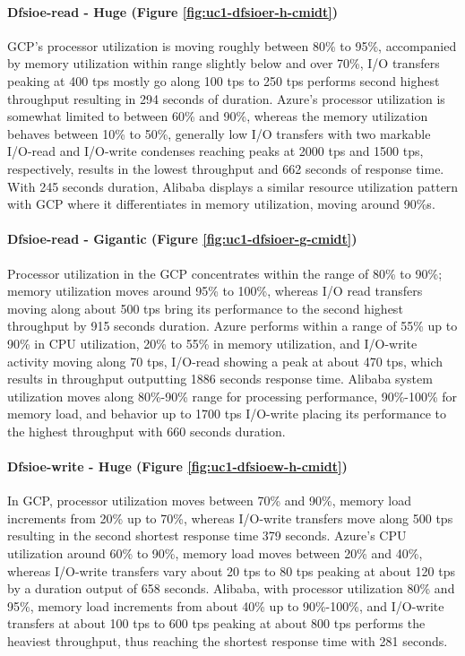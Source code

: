 \documentclass[review]{elsarticle}
\begin{document}
\paragraph{Dfsioe-read - Huge (Figure \ref{fig:uc1-dfsioer-h-cmidt})}GCP's processor utilization is moving roughly between 80\% to 95\%, accompanied by memory utilization within range slightly below and over 70\%, I/O transfers peaking at 400 tps mostly go along 100 tps to 250 tps performs second highest throughput resulting in 294 seconds of duration. Azure's processor utilization is somewhat limited to between 60\% and 90\%, whereas the memory utilization behaves between 10\% to 50\%, generally low I/O transfers with two markable I/O-read and I/O-write condenses reaching peaks at 2000 tps and 1500 tps, respectively, results in the lowest throughput and 662 seconds of response time. With 245 seconds duration, Alibaba displays a similar resource utilization pattern with GCP where it differentiates in memory utilization, moving around 90\%s.

\paragraph{Dfsioe-read - Gigantic (Figure \ref{fig:uc1-dfsioer-g-cmidt})}Processor utilization in the GCP concentrates within the range of 80\% to 90\%; memory utilization moves around 95\% to 100\%, whereas I/O read transfers moving along about 500 tps bring its performance to the second highest throughput by 915 seconds duration. Azure performs within a range of 55\% up to 90\% in CPU utilization, 20\% to 55\% in memory utilization, and I/O-write activity moving along 70 tps, I/O-read showing a peak at about 470 tps, which results in throughput outputting 1886 seconds response time. Alibaba system utilization moves along 80\%-90\% range for processing performance, 90\%-100\% for memory load, and behavior up to 1700 tps I/O-write placing its performance to the highest throughput with 660 seconds duration.

\paragraph{Dfsioe-write - Huge (Figure \ref{fig:uc1-dfsioew-h-cmidt})}In GCP, processor utilization moves between 70\% and 90\%, memory load increments from 20\% up to 70\%, whereas I/O-write transfers move along 500 tps resulting in the second shortest response time 379 seconds. Azure's CPU utilization around 60\% to 90\%, memory load moves between 20\% and 40\%, whereas I/O-write transfers vary about 20 tps to 80 tps peaking at about 120 tps by a duration output of 658 seconds. Alibaba, with processor utilization 80\% and 95\%, memory load increments from about 40\% up to 90\%-100\%, and I/O-write transfers at about 100 tps to 600 tps peaking at about 800 tps performs the heaviest throughput, thus reaching the shortest response time with 281 seconds.
\end{document}
